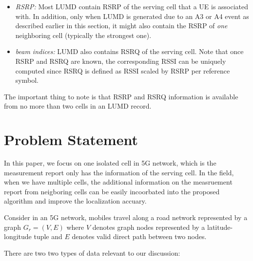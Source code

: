 \documentclass[conference, 10pt]{IEEEtran}
\begin{document}
\begin{itemize}

\item {\em RSRP:} Most LUMD contain RSRP of the serving cell that a UE is associated
with. In addition, only when LUMD is generated due to an A3 or A4 event as described
earlier in this section, it might also contain the RSRP of {\em one} neighboring
cell (typically the strongest one).

\item {\em beam indices:} LUMD also contains RSRQ of the serving cell. Note that once RSRP
and RSRQ are known, the corresponding RSSI can be uniquely computed since RSRQ is
defined as RSSI scaled by RSRP per reference symbol.

\end{itemize}

The important thing to note is that RSRP and RSRQ information is available from no
more than two cells in an LUMD record.





\section{Problem Statement} 
\label{sec:ps}

In this paper, we focus on one isolated cell in 5G network, which is the measurement report
only has the information of the serving cell. In the field, when we have multiple cells, the additional
information on the measruement report from neigboring cells can be easily incoorbated into the proposed algorithm and improve the 
localization accuary.

Consider in an 5G network, mobiles travel along a road network represented by a graph $G_r=(V,E)$ where $V$
denotes graph nodes represented by a latitude-longitude tuple and $E$ denotes
valid direct path between two nodes.

There are two two types of data relevant to our discussion:
\end{document}
